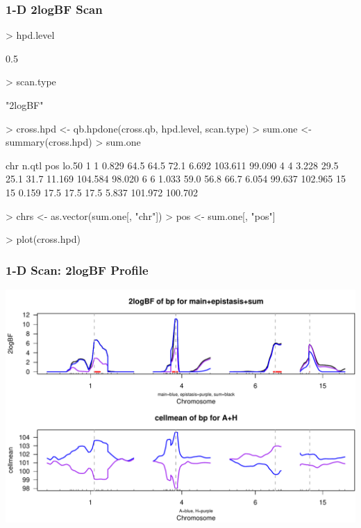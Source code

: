 \documentclass{beamer}
\begin{document}
\begin{frame}[fragile]
  \frametitle{1-D 2logBF Scan}

\tiny

\begin{Schunk}
\begin{Sinput}
> hpd.level
\end{Sinput}
\begin{Soutput}
[1] 0.5
\end{Soutput}
\begin{Sinput}
> scan.type
\end{Sinput}
\begin{Soutput}
[1] "2logBF"
\end{Soutput}
\begin{Sinput}
> cross.hpd <- qb.hpdone(cross.qb, hpd.level, scan.type)
> sum.one <- summary(cross.hpd)
> sum.one
\end{Sinput}
\begin{Soutput}
   chr n.qtl  pos lo.50%
1    1 0.829 64.5   64.5   72.1  6.692 103.611  99.090
4    4 3.228 29.5   25.1   31.7 11.169 104.584  98.020
6    6 1.033 59.0   56.8   66.7  6.054  99.637 102.965
15  15 0.159 17.5   17.5   17.5  5.837 101.972 100.702
\end{Soutput}
\begin{Sinput}
> chrs <- as.vector(sum.one[, "chr"])
> pos <- sum.one[, "pos"]
\end{Sinput}
\end{Schunk}
\begin{Schunk}
\begin{Sinput}
> plot(cross.hpd)
\end{Sinput}
\end{Schunk}

\end{frame}

\begin{frame}[fragile]
  \frametitle{1-D Scan: 2logBF Profile}

\includegraphics{bpPDF/slide1hpd.pdf}
\end{frame}
\end{document}
